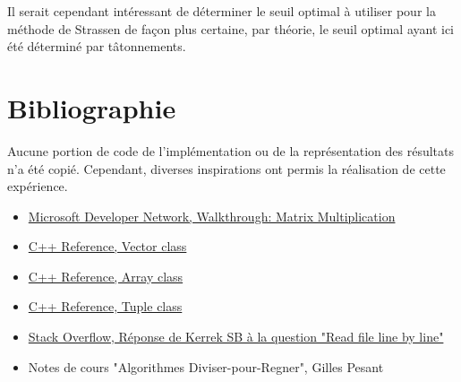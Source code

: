 \documentclass[10pt,a4paper]{article}
\begin{document}
Il serait cependant intéressant de déterminer le seuil optimal à utiliser pour la méthode de Strassen de façon plus certaine, par théorie, le seuil optimal ayant ici été déterminé par tâtonnements.

\section{Bibliographie}

Aucune portion de code de l'implémentation ou de la représentation des résultats n'a été copié. Cependant, diverses inspirations ont permis la réalisation de cette expérience.

\begin{itemize}
	\item \href{http://msdn.microsoft.com/en-us/library/hh873134.aspx}{Microsoft Developer Network, Walkthrough: Matrix Multiplication}
	\item \href{http://www.cplusplus.com/reference/vector/vector/}{C++ Reference, Vector class}
	\item \href{http://www.cplusplus.com/doc/tutorial/arrays/}{C++ Reference, Array class}
	\item \href{http://www.cplusplus.com/reference/tuple/tuple/}{C++ Reference, Tuple class}
	\item \href{http://stackoverflow.com/questions/7868936/c-read-file-line-by-line}{Stack Overflow, Réponse de Kerrek SB à la question "Read file line by line"}
	\item Notes de cours "Algorithmes Diviser-pour-Regner", Gilles Pesant
\end{itemize}
\end{document}
